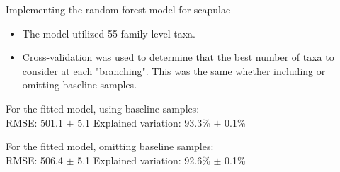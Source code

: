 \documentclass{beamer}
\begin{document}
\begin{frame}{Implementing the random forest model for scapulae}

\begin{itemize}
\item The model utilized 55 family-level taxa.
\item Cross-validation was used to determine that the best number of
  taxa to consider at each "branching".  This was the same whether
  including or omitting baseline samples.
\end{itemize}

\vspace{0.1in}

\noindent For the fitted model, using baseline samples:\\
\noindent RMSE: 501.1 $\pm$ 5.1  \hspace{0.05in}  Explained variation: 93.3\%
$\pm$ 0.1\%

\vspace{0.1in}

\noindent For the fitted model, omitting baseline samples:\\
\noindent RMSE: 506.4 $\pm$ 5.1  \hspace{0.05in}  Explained variation: 92.6\%
$\pm$ 0.1\%

\end{frame}
\end{document}
